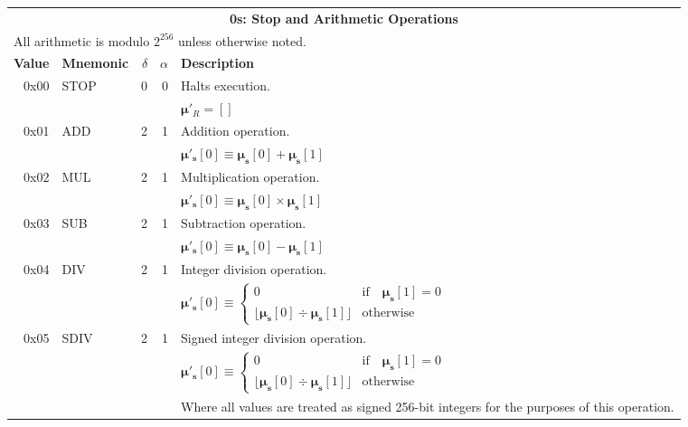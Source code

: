 \documentclass[9pt,oneside]{amsart}
\begin{document}
\begin{tabular*}{\columnwidth}[h]{rlrrl}
\toprule
\multicolumn{5}{c}{\textbf{0s: Stop and Arithmetic Operations}} \\
\multicolumn{5}{l}{All arithmetic is modulo $2^{256}$ unless otherwise noted.} \vspace{5pt} \\
\textbf{Value} & \textbf{Mnemonic} & $\delta$ & $\alpha$ & \textbf{Description} \vspace{5pt} \\
0x00 & {\small STOP} & 0 & 0 & Halts execution. \\
&&&& $\boldsymbol{\mu}'_R = []$ \\
\midrule
0x01 & {\small ADD} & 2 & 1 & Addition operation. \\
&&&& $\boldsymbol{\mu}'_\mathbf{s}[0] \equiv \boldsymbol{\mu}_\mathbf{s}[0] + \boldsymbol{\mu}_\mathbf{s}[1]$ \\
\midrule
0x02 & {\small MUL} & 2 & 1 & Multiplication operation. \\
&&&& $\boldsymbol{\mu}'_\mathbf{s}[0] \equiv \boldsymbol{\mu}_\mathbf{s}[0] \times \boldsymbol{\mu}_\mathbf{s}[1]$ \\
\midrule
0x03 & {\small SUB} & 2 & 1 & Subtraction operation. \\
&&&& $\boldsymbol{\mu}'_\mathbf{s}[0] \equiv \boldsymbol{\mu}_\mathbf{s}[0] - \boldsymbol{\mu}_\mathbf{s}[1]$ \\
\midrule
0x04 & {\small DIV} & 2 & 1 & Integer division operation. \\
&&&& $\boldsymbol{\mu}'_\mathbf{s}[0] \equiv \begin{cases}0 & \text{if} \quad \boldsymbol{\mu}_\mathbf{s}[1] = 0\\ \lfloor\boldsymbol{\mu}_\mathbf{s}[0] \div \boldsymbol{\mu}_\mathbf{s}[1]\rfloor & \text{otherwise}\end{cases}$  \\
\midrule
0x05 & {\small SDIV} & 2 & 1 & Signed integer division operation. \\
&&&& $\boldsymbol{\mu}'_\mathbf{s}[0] \equiv \begin{cases}0 & \text{if} \quad \boldsymbol{\mu}_\mathbf{s}[1] = 0\\ \lfloor\boldsymbol{\mu}_\mathbf{s}[0] \div \boldsymbol{\mu}_\mathbf{s}[1]\rfloor & \text{otherwise}\end{cases}$  \\
&&&& Where all values are treated as signed 256-bit integers for the purposes of this operation. \\

\end{tabular*}
\end{document}
